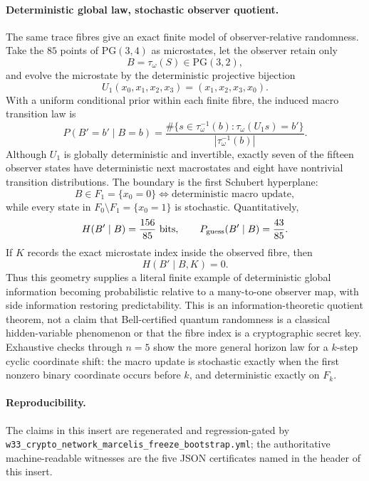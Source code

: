 \paragraph{Deterministic global law, stochastic observer quotient.}
The same trace fibres give an exact finite model of observer-relative
randomness.  Take the $85$ points of $\mathrm{PG}(3,4)$ as microstates, let the observer
retain only
\[
B=\tau_\omega(S)\in\mathrm{PG}(3,2),
\]
and evolve the microstate by the deterministic projective bijection
\[
U_1(x_0,x_1,x_2,x_3)=(x_1,x_2,x_3,x_0).
\]
With a uniform conditional prior within each finite fibre, the induced macro
transition law is
\[
P(B'=b'\mid B=b)
=
\frac{\#\{s\in\tau_\omega^{-1}(b):\tau_\omega(U_1s)=b'\}}
{|\tau_\omega^{-1}(b)|}.
\]
Although $U_1$ is globally deterministic and invertible, exactly seven of the
fifteen observer states have deterministic next macrostates and eight have
nontrivial transition distributions.  The boundary is the first Schubert
hyperplane:
\[
B\in F_1=\{x_0=0\}\Longleftrightarrow\text{deterministic macro update},
\]
while every state in $F_0\setminus F_1=\{x_0=1\}$ is stochastic.  Quantitatively,
\[
H(B'\mid B)=\frac{156}{85}\ \text{bits},
\qquad
P_{\rm guess}(B'\mid B)=\frac{43}{85}.
\]
If $K$ records the exact microstate index inside the observed fibre, then
\[
H(B'\mid B,K)=0.
\]
Thus this geometry supplies a literal finite example of deterministic global
information becoming probabilistic relative to a many-to-one observer map,
with side information restoring predictability.  This is an
information-theoretic quotient theorem, not a claim that Bell-certified quantum
randomness is a classical hidden-variable phenomenon or that the fibre index is
a cryptographic secret key.  Exhaustive checks through $n=5$ show the more
general horizon law for a $k$-step cyclic coordinate shift: the macro update is
stochastic exactly when the first nonzero binary coordinate occurs before $k$,
and deterministic exactly on $F_k$.

\paragraph{Reproducibility.}
The claims in this insert are regenerated and regression-gated by
\texttt{w33\_crypto\_network\_marcelis\_freeze\_bootstrap.yml}; the authoritative
machine-readable witnesses are the five JSON certificates named in the header
of this insert.
